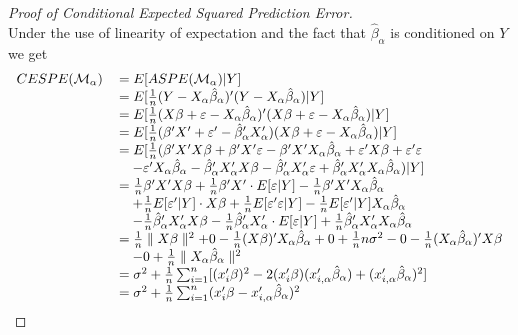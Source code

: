 \documentclass[Research_Module_ES.tex]{subfiles}
\begin{document}
\begin{proof}[Proof of Conditional Expected Squared Prediction Error] ~\\Under the use of linearity of expectation and the fact that $\hat{\beta}_\alpha$ is conditioned on $Y$ we get 
	\begin{align*}
	\begin{tabular}{ll}
	$CESPE(\mathcal{M}_\alpha)$&$=E[ASPE(\mathcal{M}_\alpha)|Y]$\\
	&$=E[\frac{1}{n}(Y-X_\alpha\hat{\beta}_\alpha)^\prime(Y-X_\alpha\hat{\beta}_\alpha)|Y]$\\
	&$=E[\frac{1}{n}(X\beta+\varepsilon-X_\alpha\hat{\beta}_\alpha)^\prime(X\beta+\varepsilon-X_\alpha\hat{\beta}_\alpha)|Y]$\\
	&$=E[\frac{1}{n}(\beta^\prime X^\prime+\varepsilon^\prime-\hat{\beta}_\alpha^\prime X_\alpha^\prime)(X\beta+\varepsilon-X_\alpha\hat{\beta}_\alpha)|Y]$\\
	&$=E[\frac{1}{n}(\beta^\prime X^\prime X\beta+\beta^\prime X^\prime\varepsilon-\beta^\prime X^\prime X_\alpha\hat{\beta}_\alpha+\varepsilon^\prime X\beta+\varepsilon^\prime\varepsilon$\\&$~~~-\varepsilon^\prime X_\alpha\hat{\beta}_\alpha-\hat{\beta}_\alpha^\prime X_\alpha^\prime X\beta-\hat{\beta}_\alpha^\prime X_\alpha^\prime\varepsilon+\hat{\beta}_\alpha^\prime X_\alpha^\prime X_\alpha\hat{\beta}_\alpha)|Y]$\\
	&$=\frac{1}{n}\beta^\prime X^\prime X\beta+\frac{1}{n}\beta^\prime X^\prime\cdot E[\varepsilon|Y]-\frac{1}{n}\beta^\prime X^\prime X_\alpha\hat{\beta}_\alpha$\\
	&$~~~+\frac{1}{n}E[\varepsilon^\prime|Y]\cdot X\beta+\frac{1}{n}E[\varepsilon^\prime\varepsilon|Y]-\frac{1}{n}E[\varepsilon^\prime|Y]X_\alpha\hat{\beta}_\alpha$\\
	&$~~~-\frac{1}{n}\hat{\beta}_\alpha^\prime X_\alpha^\prime X\beta-\frac{1}{n}\hat{\beta}_\alpha^\prime X_\alpha^\prime\cdot E[\varepsilon|Y]+\frac{1}{n}\hat{\beta}_\alpha^\prime X_\alpha^\prime X_\alpha\hat{\beta}_\alpha$\\
	&$=\frac{1}{n}\parallel X\beta\parallel^2+0-\frac{1}{n} (X\beta)^\prime X_\alpha\hat{\beta}_\alpha+0+\frac{1}{n} n\sigma^2-0-\frac{1}{n}(X_\alpha\hat{\beta}_\alpha)^\prime X\beta$\\
	&$~~~-0+\frac{1}{n}\parallel X_\alpha\hat{\beta}_\alpha\parallel^2$\\
	&$=\sigma^2+\frac{1}{n}\sum_{i=1}^{n}[(x_i^\prime\beta)^2-2(x_i^\prime\beta)(x_{i,\alpha}^\prime\hat{\beta}_\alpha)+(x_{i,\alpha}^\prime\hat{\beta}_\alpha)^2]$\\
	&$=\sigma^2+\frac{1}{n}\sum_{i=1}^{n}(x_i^\prime\beta-x_{i,\alpha}^\prime\hat{\beta}_\alpha)^2$
	\end{tabular}
	\end{align*}
\end{proof}
\end{document}
